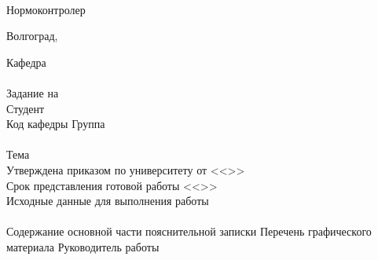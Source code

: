 {    \vspace{\fill}\\
    Нормоконтролер 
    \hfill
    \\
    \vspace{\fill}
    \begin{center}
    Волгоград,~\the\year
    \end{center}
    \clearpage
    \begin{center}
    \VSTUTitleHeading
    \end{center}
    Кафедра~\uline{\VSTUDepartment\hfill}\\
    \vfill
    \hfill\VSTUTitleHeadApproval
    \vspace{\fill}
    \\Задание на \\
    Студент \\
    Код кафедры \uline{\makebox[4cm]{\VSTUDepartmentCode}} \hfill Группа \uline{\makebox[4cm]{\VSTUStudentGroup}}\\
    \vspace{1mm}\\
    Тема \VSTUTitleUL\\
    Утверждена приказом по университету от <<\uline{\makebox[0.5cm]{\VSTUOrderDate}}>> \uline{\makebox[1.8cm]{\VSTUOrderMonth}} \uline{\makebox[1.2cm]{\VSTUOrderYear}} \textnumero\uline{\makebox[2cm]{\VSTUOrderNumber}}\\
    Срок представления готовой работы <<\uline{\makebox[0.5cm]{\VSTUDeadlineDate}}>> \uline{\makebox[2cm]{\VSTUDeadlineMonth}} \uline{\makebox[1.2cm]{\the\year}} \\
    Исходные данные для выполнения работы\\
    \VSTUInitialDataUL
    \vspace{2mm}\\
    Содержание основной части пояснительной записки
    {\small
    \VSTUPZContents
    }
    \noindent Перечень графического материала
    {\small
    \VSTUPZGraphics
    }
    \vspace{\fill}
    \noindent Руководитель работы 
}
